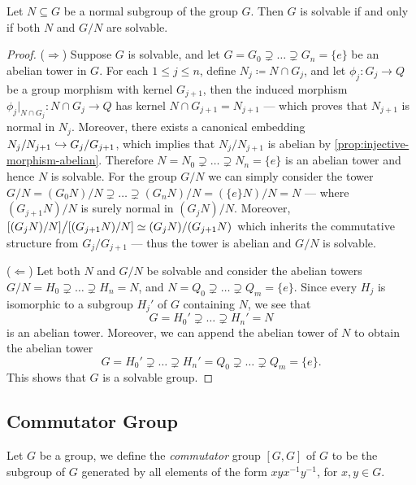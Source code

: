 \begin{theorem}
\label{thm:solvable-iff-normal-and-quotient-solvable}
Let \(N \subseteq G\) be a normal subgroup of the group \(G\). Then \(G\) is
solvable if and only if both \(N\) and \(G/N\) are solvable.
\end{theorem}

\begin{proof}
(\(\Rightarrow\)) Suppose \(G\) is solvable, and let \(G = G_0 \supsetneq \dots
\supsetneq G_n = \{e\}\) be an abelian tower in \(G\).  For each \(1 \leq j \leq
n\), define \(N_{j} \coloneq N \cap G_j\), and let \(\phi_j: G_j \to Q\) be a
group morphism with kernel \(G_{j+1}\), then the induced morphism \(\phi_j|_{N
\cap G_j}: N \cap G_j \to Q\) has kernel \(N \cap G_{j+1} = N_{j+1}\) --- which
proves that \(N_{j+1}\) is normal in \(N_j\). Moreover, there exists a canonical
embedding \(N_j/N_{j+1} \hookrightarrow G_j/G_{j+1}\), which implies that \(N_j/N_{j+1}\)
is abelian by \cref{prop:injective-morphism-abelian}. Therefore \(N = N_0
\supsetneq \dots \supsetneq N_n = \{e\}\) is an abelian tower and hence \(N\) is
solvable. For the group \(G/N\) we can simply consider the tower \(G/N = (G_0
N)/N \supsetneq \dots \supsetneq (G_n N)/N = (\{e\} N)/N = N\) --- where
\((G_{j+1} N)/N\) is surely normal in \((G_j N)/N\). Moreover, \([(G_j N)/N]
\big/ [(G_{j+1} N)/N] \simeq (G_j N)/(G_{j+1} N)\) which inherits the commutative
structure from \(G_j/G_{j+1}\) --- thus the tower is abelian and \(G/N\) is
solvable.

(\(\Leftarrow\)) Let both \(N\) and \(G/N\) be solvable and consider the abelian
towers \(G/N = H_0 \supsetneq \dots \supsetneq H_n = N\), and \(N = Q_0
\supsetneq \dots \supsetneq Q_m = \{e\}\). Since every \(H_j\) is isomorphic to
a subgroup \(H_j'\) of \(G\) containing \(N\), we see that
\[
  G = H_0' \supsetneq \dots \supsetneq H_n' = N
\]
is an abelian tower. Moreover, we can append the abelian tower of \(N\) to
obtain the abelian tower
\[
G = H_0' \supsetneq \dots \supsetneq H_n'
= Q_0 \supsetneq \dots \supsetneq Q_m = \{e\}.
\]
This shows that \(G\) is a solvable group.
\end{proof}

\subsection{Commutator Group}

\begin{definition}
\label{def:commutator-group}
Let \(G\) be a group, we define the \emph{commutator} group \([G, G]\) of \(G\)
to be the subgroup of \(G\) generated by all elements of the form \(x y x^{-1}
y^{-1}\), for \(x, y \in G\).
\end{definition}

